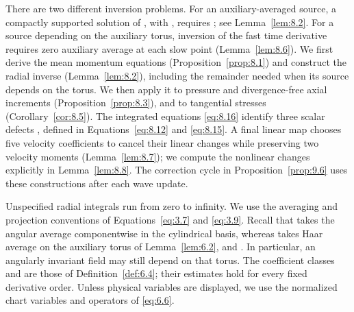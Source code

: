There are two different inversion problems. For an auxiliary-averaged source, a compactly
supported solution  of
, with
, requires
; see
Lemma~\ref{lem:8.2}. For a source depending on the auxiliary torus, inversion of the fast time
derivative requires zero auxiliary average at each slow point (Lemma~\ref{lem:8.6}). We first derive the
mean momentum equations (Proposition~\ref{prop:8.1}) and construct the radial inverse (Lemma~\ref{lem:8.2}),
including the remainder needed when its source depends on the torus. We then apply it to
pressure and divergence-free axial increments (Proposition~\ref{prop:8.3}), and to tangential stresses
(Corollary~\ref{cor:8.5}). The integrated equations \eqref{eq:8.16} identify three scalar defects
, defined
in Equations~\eqref{eq:8.12} and \eqref{eq:8.15}. A final linear map chooses five velocity coefficients to cancel
their linear changes while preserving two velocity moments (Lemma~\ref{lem:8.7}); we compute the
nonlinear changes explicitly in Lemma~\ref{lem:8.8}. The correction cycle in Proposition~\ref{prop:9.6} uses these
constructions after each wave update.

Unspecified radial integrals run from zero to infinity. We use the averaging and projection
conventions of Equations~\eqref{eq:3.7} and \eqref{eq:3.9}. Recall that
 takes the angular average componentwise
in the cylindrical basis, whereas  takes Haar average on the auxiliary torus of
Lemma~\ref{lem:6.2}, and . In particular, an angularly invariant field may still depend
on that torus. The coefficient classes  and
 are those of Definition~\ref{def:6.4}; their estimates
hold for every fixed derivative order. Unless physical variables are displayed, we use the
normalized chart variables and operators of \eqref{eq:6.6}.

